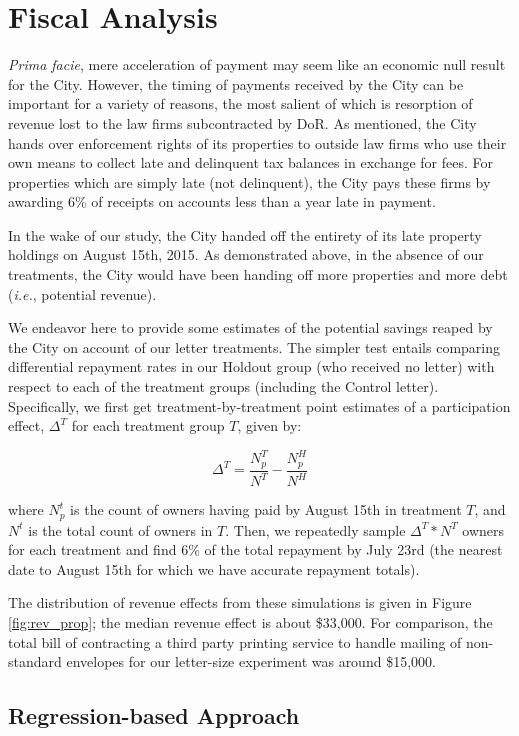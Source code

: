 \documentclass[12pt,titlepage]{article}
\begin{document}
\section{Fiscal Analysis}

\textit{Prima facie}, mere acceleration of payment may seem like an
economic null result for the City. However, the timing of payments received
by the City can be important for a variety of reasons, the most salient of
which is resorption of revenue lost to the law firms subcontracted by DoR.
As mentioned, the City hands over enforcement rights of its properties to
outside law firms who use their own means to collect late and delinquent
tax balances in exchange for fees. For properties which are simply late
(not delinquent), the City pays these firms by awarding 6\% of receipts on
accounts less than a year late in payment.

In the wake of our study, the City handed off the entirety of its late 
property holdings on August 15th, 2015. As demonstrated above, in the
absence of our treatments, the City would have been handing off more
properties and more debt (\textit{i.e.}, potential revenue).

We endeavor here to provide some estimates of the potential savings
reaped by the City on account of our letter treatments. The simpler test
entails comparing differential repayment rates in our Holdout group
(who received no letter) with respect to each of the treatment groups 
(including the Control letter). Specifically, we first get 
treatment-by-treatment point estimates of a participation effect,
$\Delta^T$ for each treatment group $T$, given by:

\[
\Delta^T = \frac{N^T_p}{N^T} - \frac{N^H_p}{N^H}
\]

where $N^t_p$ is the count of owners having paid by August 15th in
treatment $T$, and $N^t$ is the total count of owners in $T$. Then,
we repeatedly sample $\Delta^T * N^T$ owners for each treatment and find
6\% of the total repayment by July 23rd (the nearest date to August
15th for which we have accurate repayment totals).

The distribution of revenue effects from these simulations is given
in Figure \ref{fig:rev_prop}; the median revenue effect is about
\$33,000. For comparison, the total bill of contracting a third party
printing service to handle mailing of non-standard envelopes for 
our letter-size experiment was around \$15,000.

\subsection{Regression-based Approach}
\end{document}
